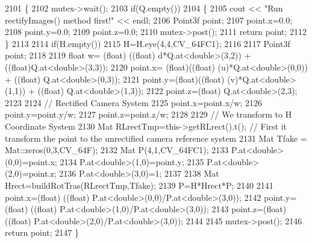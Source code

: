 \begin{DoxyCode}
2101 \{
2102     mutex->wait();
2103     \textcolor{keywordflow}{if}(Q.empty())
2104     \{
2105         cout << \textcolor{stringliteral}{"Run rectifyImages() method first!"} << endl;
2106         Point3f point;
2107         point.x=0.0;
2108         point.y=0.0;
2109         point.z=0.0;
2110         mutex->post();
2111         \textcolor{keywordflow}{return} point;
2112     \}
2113 
2114     \textcolor{keywordflow}{if}(H.empty())
2115         H=H.eye(4,4,CV\_64FC1);
2116 
2117     Point3f point;
2118 
2119     \textcolor{keywordtype}{float} w= (float) ((\textcolor{keywordtype}{float}) d*Q.at<\textcolor{keywordtype}{double}>(3,2)) + ((float)Q.at<\textcolor{keywordtype}{double}>(3,3));
2120     point.x= (float)((\textcolor{keywordtype}{float}) (u)*Q.at<\textcolor{keywordtype}{double}>(0,0)) + ((\textcolor{keywordtype}{float}) Q.at<\textcolor{keywordtype}{double}>(0,3));
2121     point.y=(float)((\textcolor{keywordtype}{float}) (v)*Q.at<\textcolor{keywordtype}{double}>(1,1)) + ((\textcolor{keywordtype}{float}) Q.at<\textcolor{keywordtype}{double}>(1,3));
2122     point.z=(float) Q.at<\textcolor{keywordtype}{double}>(2,3);
2123 
2124     \textcolor{comment}{// Rectified Camera System}
2125     point.x=point.x/w;
2126     point.y=point.y/w;
2127     point.z=point.z/w;
2128 
2129     \textcolor{comment}{// We transform to H Coordinate System}
2130     Mat RLrectTmp=this->getRLrect().t(); \textcolor{comment}{// First it transform the point to the unrectified camera
       reference system}
2131     Mat Tfake = Mat::zeros(0,3,CV\_64F);
2132     Mat P(4,1,CV\_64FC1);
2133     P.at<\textcolor{keywordtype}{double}>(0,0)=point.x;
2134     P.at<\textcolor{keywordtype}{double}>(1,0)=point.y;
2135     P.at<\textcolor{keywordtype}{double}>(2,0)=point.z;
2136     P.at<\textcolor{keywordtype}{double}>(3,0)=1;
2137 
2138     Mat Hrect=buildRotTras(RLrectTmp,Tfake);
2139     P=H*Hrect*P;
2140 
2141     point.x=(float) ((\textcolor{keywordtype}{float}) P.at<\textcolor{keywordtype}{double}>(0,0)/P.at<\textcolor{keywordtype}{double}>(3,0));
2142     point.y=(float) ((\textcolor{keywordtype}{float}) P.at<\textcolor{keywordtype}{double}>(1,0)/P.at<\textcolor{keywordtype}{double}>(3,0));
2143     point.z=(float) ((\textcolor{keywordtype}{float}) P.at<\textcolor{keywordtype}{double}>(2,0)/P.at<\textcolor{keywordtype}{double}>(3,0));
2144 
2145     mutex->post();
2146     \textcolor{keywordflow}{return} point;
2147 \}
\end{DoxyCode}
\mbox{\label{classStereoCamera_a3c8ef84424fa111c63437a3db8f04333}} 
